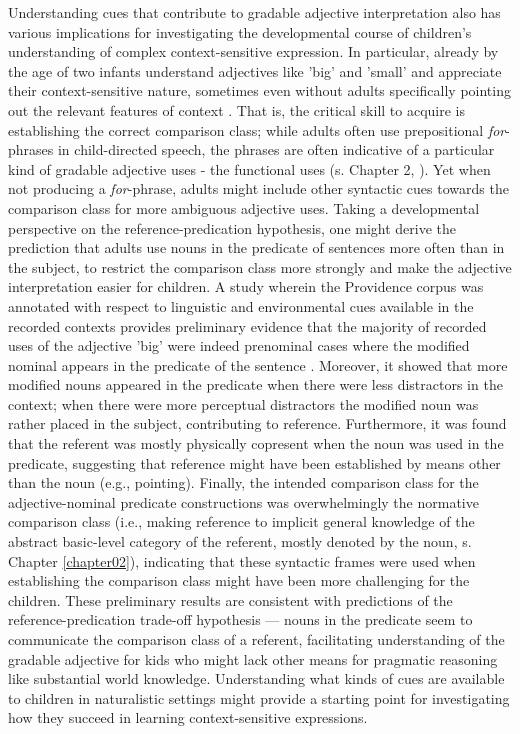 Understanding cues that contribute to gradable adjective interpretation also has various implications for investigating the developmental course of children's understanding of complex context-sensitive expression. In particular, already by the age of two infants understand adjectives like 'big' and 'small' and appreciate their context-sensitive nature, sometimes even without adults specifically pointing out the relevant features of context \parencite{Mintz2002, ebeling1994children}. That is, the critical skill to acquire is establishing the correct comparison class; while adults often use prepositional \emph{for}-phrases in child-directed speech, the phrases are often indicative of a particular kind of gradable adjective uses - the functional uses (s. Chapter 2, \textcite{ebeling1994children}). Yet when not producing a \emph{for}-phrase, adults might include other syntactic cues towards the comparison class for more ambiguous adjective uses. Taking a developmental perspective on the reference-predication hypothesis, one might derive the prediction that adults use nouns in the predicate of sentences more often than in the subject, to restrict the comparison class more strongly and make the adjective interpretation easier for children. A study wherein the Providence corpus was annotated with respect to linguistic and environmental cues available in the recorded contexts provides preliminary evidence that the majority of recorded uses of the adjective 'big' were indeed prenominal cases where the modified nominal appears in the predicate of the sentence \parencite{sinelnikova2020}. 
Moreover, it showed that more modified nouns appeared in the predicate when there were less distractors in the context; when there were more perceptual distractors the modified noun was rather placed in the subject, contributing to reference. Furthermore, it was found that the referent was mostly physically copresent when the noun was used in the predicate, suggesting that reference might have been established by means other than the noun (e.g., pointing). Finally, the intended comparison class for the adjective-nominal predicate constructions was overwhelmingly the normative comparison class (i.e., making reference to implicit general knowledge of the abstract basic-level  category of the referent, mostly denoted by the noun, s. Chapter \ref{chapter02}), indicating that these syntactic frames were used when establishing the comparison class might have been more challenging for the children. These preliminary results are consistent with predictions of the reference-predication trade-off hypothesis ---  nouns in the predicate seem to communicate the comparison class of a referent, facilitating understanding of the gradable adjective for kids who might lack other means for pragmatic reasoning like substantial world knowledge. 
Understanding what kinds of cues are available to children in naturalistic settings might provide a starting point for investigating how they succeed in learning context-sensitive expressions. 

